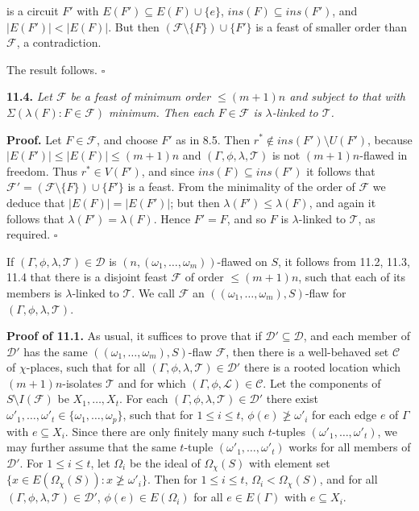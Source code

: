 \noindent is a circuit $F'$ with $E(F') \subseteq E(F) \cup \{e\}$, $ins(F) \subseteq ins(F')$, and $|E(F')| < |E(F)|$. But then $(\mathscr{F} \setminus \{F\}) \cup \{F'\}$ is a feast of smaller order than $\mathscr{F}$, a contradiction.

The result follows. $\square$

\textbf{11.4.} \textit{Let $\mathscr{F}$ be a feast of minimum order $\le (m+1)n$ and subject to that with $\Sigma(\lambda(F) : F \in \mathscr{F})$ minimum. Then each $F \in \mathscr{F}$ is $\lambda$-linked to $\mathscr{T}$.}

\textbf{Proof.} Let $F \in \mathscr{F}$, and choose $F'$ as in 8.5. Then $r^* \notin ins(F') \setminus U(F')$, because $|E(F')| \le |E(F)| \le (m+1)n$ and $(\Gamma, \phi, \lambda, \mathscr{T})$ is not $(m+1)n$-flawed in freedom. Thus $r^* \in V(F')$, and since $ins(F) \subseteq ins(F')$ it follows that $\mathscr{F}' = (\mathscr{F} \setminus \{F\}) \cup \{F'\}$ is a feast. From the minimality of the order of $\mathscr{F}$ we deduce that $|E(F)| = |E(F')|$; but then $\lambda(F') \le \lambda(F)$, and again it follows that $\lambda(F') = \lambda(F)$. Hence $F' = F$, and so $F$ is $\lambda$-linked to $\mathscr{T}$, as required. $\square$

If $(\Gamma, \phi, \lambda, \mathscr{T}) \in \mathscr{D}$ is $(n, (\omega_1, \ldots, \omega_m))$-flawed on $S$, it follows from 11.2, 11.3, 11.4 that there is a disjoint feast $\mathscr{F}$ of order $\le (m+1)n$, such that each of its members is $\lambda$-linked to $\mathscr{T}$. We call $\mathscr{F}$ an $((\omega_1, \ldots, \omega_m), S)$-flaw for $(\Gamma, \phi, \lambda, \mathscr{T})$.

\textbf{Proof of 11.1.} As usual, it suffices to prove that if $\mathscr{D}' \subseteq \mathscr{D}$, and each member of $\mathscr{D}'$ has the same $((\omega_1, \ldots, \omega_m), S)$-flaw $\mathscr{F}$, then there is a well-behaved set $\mathscr{C}$ of $\chi$-places, such that for all $(\Gamma, \phi, \lambda, \mathscr{T}) \in \mathscr{D}'$ there is a rooted location which $(m+1)n$-isolates $\mathscr{T}$ and for which $(\Gamma, \phi, \mathscr{L}) \in \mathscr{C}$. Let the components of $S \setminus I(\mathscr{F})$ be $X_1, \ldots, X_t$. For each $(\Gamma, \phi, \lambda, \mathscr{T}) \in \mathscr{D}'$ there exist $\omega'_1, \ldots, \omega'_t \in \{\omega_1, \ldots, \omega_p\}$, such that for $1 \le i \le t$, $\phi(e) \not\ge \omega'_i$ for each edge $e$ of $\Gamma$ with $e \subseteq X_i$. Since there are only finitely many such $t$-tuples $(\omega'_1, \ldots, \omega'_t)$, we may further assume that the same $t$-tuple $(\omega'_1, \ldots, \omega'_t)$ works for all members of $\mathscr{D}'$. For $1 \le i \le t$, let $\Omega_i$ be the ideal of $\Omega_\chi(S)$ with element set $\{x \in E(\Omega_\chi(S)) : x \not\ge \omega'_i\}$. Then for $1 \le i \le t$, $\Omega_i < \Omega_\chi(S)$, and for all $(\Gamma, \phi, \lambda, \mathscr{T}) \in \mathscr{D}'$, $\phi(e) \in E(\Omega_i)$ for all $e \in E(\Gamma)$ with $e \subseteq X_i$.

